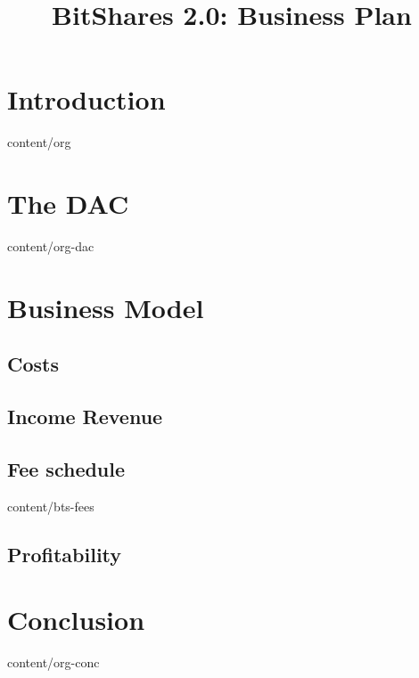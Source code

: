 \documentclass[conference,final,10pt,a4paper]{IEEEtran}
\title{BitShares 2.0: Business Plan}
\author{}
\begin{document}
\sloppy
\maketitle

\begin{abstract}
\end{abstract}
\section    { Introduction   }  { content/org      } 
\section    { The DAC        }  { content/org-dac  } 
\section    { Business Model } 
\subsection { Costs          } 
\subsection { Income Revenue } 
\subsection { Fee schedule   }  { content/bts-fees } 
\subsection { Profitability  } 
\section    { Conclusion     }  { content/org-conc } 


\end{document}
